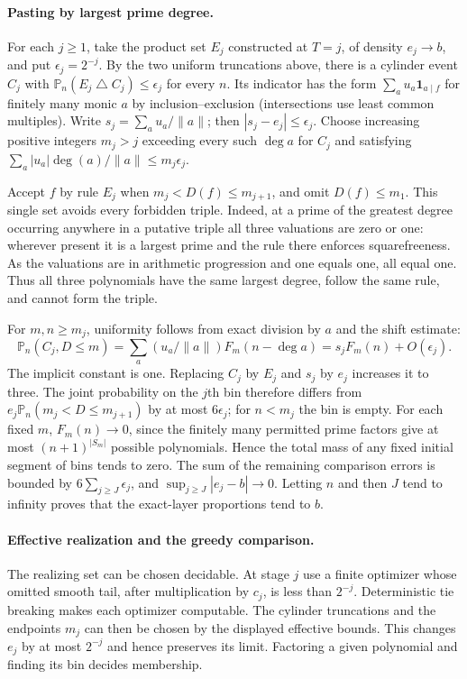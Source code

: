 \paragraph{Pasting by largest prime degree.}
For each $j\ge1$, take the product set $E_j$ constructed at $T=j$, of density $e_j\to b$, and put $\epsilon_j=2^{-j}$. By the two uniform truncations above, there is a cylinder event $C_j$ with $\mathbb P_n(E_j\mathbin{\triangle} C_j)\le\epsilon_j$ for every $n$. Its indicator has the form $\sum_a u_a\mathbf1_{a\mid f}$ for finitely many monic $a$ by inclusion--exclusion (intersections use least common multiples). Write $s_j=\sum_a u_a/\|a\|$; then $|s_j-e_j|\le\epsilon_j$. Choose increasing positive integers $m_j>j$ exceeding every such $\deg a$ for $C_j$ and satisfying $\sum_a |u_a|\deg(a)/\|a\|\le m_j\epsilon_j$.

Accept $f$ by rule $E_j$ when $m_j<D(f)\le m_{j+1}$, and omit $D(f)\le m_1$. This single set avoids every forbidden triple. Indeed, at a prime of the greatest degree occurring anywhere in a putative triple all three valuations are zero or one: wherever present it is a largest prime and the rule there enforces squarefreeness. As the valuations are in arithmetic progression and one equals one, all equal one. Thus all three polynomials have the same largest degree, follow the same rule, and cannot form the triple.

For $m,n\ge m_j$, uniformity follows from exact division by $a$ and the shift estimate:
\[
 \mathbb P_n(C_j, D\le m)=
 \sum_a (u_a/\|a\|)F_m(n-\deg a)
 =s_jF_m(n)+O(\epsilon_j).
\]
The implicit constant is one. Replacing $C_j$ by $E_j$ and $s_j$ by $e_j$ increases it to three. The joint probability on the $j$th bin therefore differs from $e_j\mathbb P_n(m_j<D\le m_{j+1})$ by at most $6\epsilon_j$; for $n<m_j$ the bin is empty. For each fixed $m$, $F_m(n)\to0$, since the finitely many permitted prime factors give at most $(n+1)^{|S_m|}$ possible polynomials. Hence the total mass of any fixed initial segment of bins tends to zero. The sum of the remaining comparison errors is bounded by $6\sum_{j\ge J}\epsilon_j$, and $\sup_{j\ge J}|e_j-b|\to0$. Letting $n$ and then $J$ tend to infinity proves that the exact-layer proportions tend to $b$.

\paragraph{Effective realization and the greedy comparison.}
The realizing set can be chosen decidable. At stage $j$ use a finite optimizer whose omitted smooth tail, after multiplication by $c_j$, is less than $2^{-j}$. Deterministic tie breaking makes each optimizer computable. The cylinder truncations and the endpoints $m_j$ can then be chosen by the displayed effective bounds. This changes $e_j$ by at most $2^{-j}$ and hence preserves its limit. Factoring a given polynomial and finding its bin decides membership.

